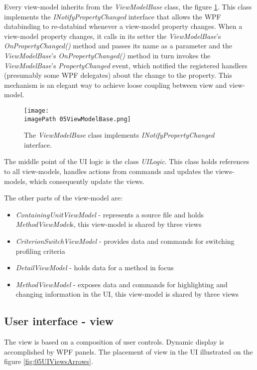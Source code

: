 Every view-model inherits from the \textit{ViewModelBase} class, the figure \ref{fig:05ViewModelBase}. This class implements the \textit{INotifyPropertyChanged} interface that allows the WPF databinding to re-databind whenever a view-model property changes. When a view-model property changes, it calls in its setter the \textit{ViewModelBase}'s \textit{OnPropertyChanged()} method and passes its name as a parameter and the \textit{ViewModelBase}'s \textit{OnPropertyChanged()} method in turn invokes the \textit{ViewModelBase}'s \textit{PropertyChanged} event, which notified the registered handlers (presumably some WPF delegates) about the change to the property. This mechanism is an elegant way to achieve loose coupling between view and view-model.
 
 \begin{figure}
	\centering
		\texttt{[image: \\imagePath 05ViewModelBase.png]}
		\caption{The \textit{ViewModelBase} class implements \textit{INotifyPropertyChanged} interface.}
	\label{fig:05ViewModelBase}
\end{figure}

The middle point of the UI logic is the class \textit{UILogic}. This class holds references to all view-models, handles actions from commands and updates the views-models, which consequently update the views.

The other parts of the view-model are:
\begin{itemize}	
\item  \textit{ContainingUnitViewModel} - represents a source file and holds \textit{MethodViewModel}s, this view-model is shared by three views	

\item \textit{CriterionSwitchViewModel} - provides data and commands for switching profiling criteria

\item \textit{DetailViewModel} - holds data for a method in focus

\item \textit{MethodViewModel} - exposes data and commands for highlighting and changing information in the UI, this view-model is shared by three views	
\end{itemize}


\subsection{User interface - view}
The view is based on a composition of user controls. Dynamic display is accomplished by WPF panels. The placement of view in the UI illustrated on the figure \ref{fig:05UIViewsArrows}. 

